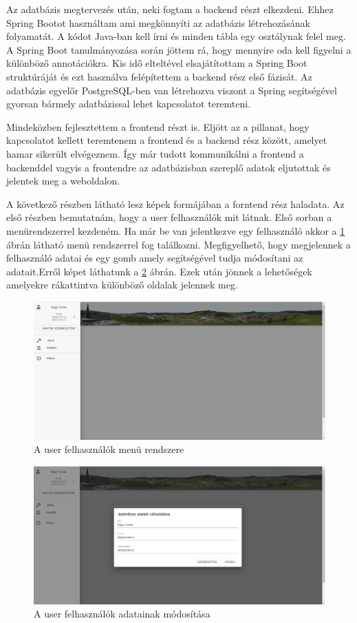 Az adatbázis megtervezés után, neki fogtam a backend részt elkezdeni. Ehhez Spring Bootot használtam ami megkönnyíti az adatbázis létrehozásának folyamatát. A kódot Java-ban kell írni és minden tábla egy osztálynak felel meg. A Spring Boot tanulmányozása során jöttem rá, hogy mennyire oda kell figyelni a különböző annotációkra. Kis idő elteltével elsajátítottam a Spring Boot struktúráját és ezt használva felépítettem a backend rész első fázisát. Az adatbázis egyelőr PostgreSQL-ben van létrehozva viszont a Spring segítségével gyorsan bármely adatbázissal lehet kapcsolatot teremteni.

Mindeközben fejlesztettem a frontend részt is. Eljött az a pillanat, hogy kapcsolatot kellett teremtenem a frontend és a backend rész között, amelyet hamar sikerült elvégeznem. Így már tudott kommunikálni a frontend a backenddel vagyis a frontendre az adatbázisban szereplő adatok eljutottak és jelentek meg a weboldalon. 

A következő részben látható lesz képek formájában a forntend rész haladata. Az első részben bemutatnám, hogy a user felhasználók mit látnak. Első sorban a menürendszerrel kezdeném. Ha már be van jelentkezve egy felhasználó akkor a \ref{fig:drawbar} ábrán látható menü rendszerrel fog találkozni. Megfigyelhető, hogy megjelennek a felhasználó adatai és egy gomb amely segítségével tudja módosítani az adatait.Erről képet láthatunk a \ref{fig:changedata} ábrán. Ezek után jönnek a lehetőségek amelyekre rákattintva különböző oldalak jelennek meg.
\begin{figure}
	\centering
	\includegraphics[scale=0.4]{figures/images/drawbar.png}
	\caption{A user felhasználók menü rendszere}
	\label{fig:drawbar}
\end{figure}
\begin{figure}
	\centering
	\includegraphics[scale=0.4]{figures/images/changedata.png}
	\caption{A user felhasználók adatainak módosítása}
	\label{fig:changedata}
\end{figure}
	
